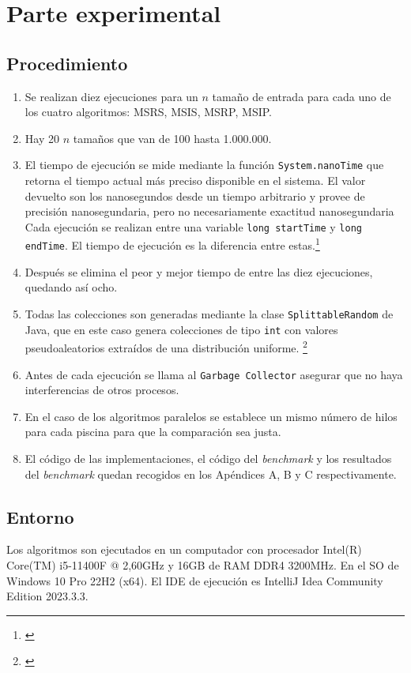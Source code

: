 \documentclass[titlepage]{article}
\begin{document}
\newpage

\section{Parte experimental}

\subsection{Procedimiento}
\begin{enumerate}
    \item Se realizan diez ejecuciones para un \(n\) tamaño de entrada para cada uno de los cuatro algoritmos: MSRS, MSIS, MSRP, MSIP.
    \item Hay 20 \(n\) tamaños que van de 100 hasta 1.000.000.
    \item El tiempo de ejecución se mide mediante la función \lstinline{System.nanoTime} que retorna el tiempo actual más preciso disponible en el sistema. El valor devuelto son los nanosegundos desde un tiempo arbitrario y provee de precisión nanosegundaria, pero no necesariamente exactitud nanosegundaria Cada ejecución se realizan entre una variable \lstinline{long startTime} y \lstinline{long endTime}. El tiempo de ejecución es la diferencia entre estas.\footnote{\cite{OracleSystem}}
    \item Después se elimina el peor y mejor tiempo de entre las diez ejecuciones, quedando así ocho.
    \item Todas las colecciones son generadas mediante la clase \lstinline{SplittableRandom} de Java, que en este caso genera colecciones de tipo \lstinline{int} con valores pseudoaleatorios extraídos de una distribución uniforme. \footnote{\cite{OracleSplittableRandom}}
    \item Antes de cada ejecución se llama al \lstinline{Garbage Collector} asegurar que no haya interferencias de otros procesos.
    \item En el caso de los algoritmos paralelos se establece un mismo número de hilos para cada piscina para que la comparación sea justa.
    \item El código de las implementaciones, el código del \textit{benchmark} y los resultados del \textit{benchmark} quedan recogidos en los Apéndices A, B y C respectivamente.
\end{enumerate}

\subsection{Entorno}
Los algoritmos son ejecutados en un computador con procesador Intel(R) Core(TM) i5-11400F @ 2,60GHz y 16GB de RAM DDR4 3200MHz. En el SO de Windows 10 Pro 22H2 (x64). El IDE de ejecución es IntelliJ Idea Community Edition 2023.3.3.
\end{document}
